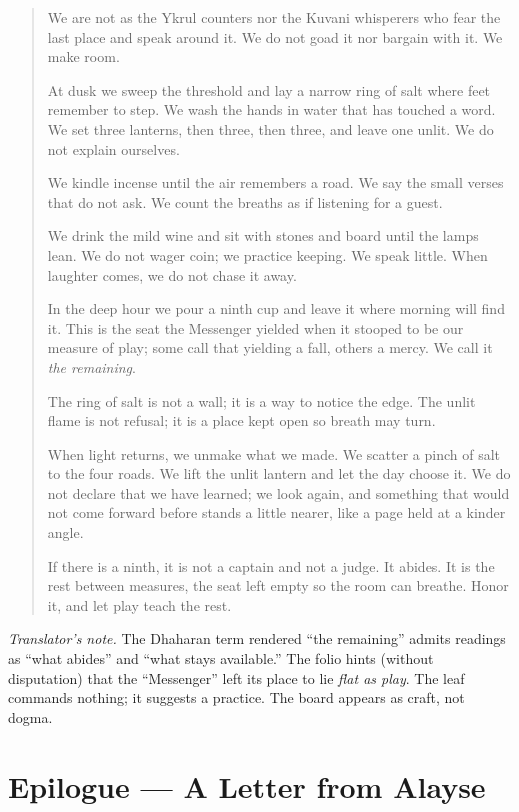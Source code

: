 \documentclass[11pt]{article}
\numberwithin{equation}{section} %
\theoremstyle{plain} %
\theoremstyle{definition} %
\theoremstyle{remark} %
\begin{document}
\medskip
\begin{quote}\small
We are not as the Ykrul counters nor the Kuvani whisperers who fear the last place and speak around it. We do not goad it nor bargain with it. We make room.

At dusk we sweep the threshold and lay a narrow ring of salt where feet remember to step. We wash the hands in water that has touched a word. We set three lanterns, then three, then three, and leave one unlit. We do not explain ourselves.

We kindle incense until the air remembers a road. We say the small verses that do not ask. We count the breaths as if listening for a guest.

We drink the mild wine and sit with stones and board until the lamps lean. We do not wager coin; we practice keeping. We speak little. When laughter comes, we do not chase it away.

In the deep hour we pour a ninth cup and leave it where morning will find it. This is the seat the Messenger yielded when it stooped to be our measure of play; some call that yielding a fall, others a mercy. We call it \emph{the remaining}.

The ring of salt is not a wall; it is a way to notice the edge. The unlit flame is not refusal; it is a place kept open so breath may turn.

When light returns, we unmake what we made. We scatter a pinch of salt to the four roads. We lift the unlit lantern and let the day choose it. We do not declare that we have learned; we look again, and something that would not come forward before stands a little nearer, like a page held at a kinder angle.

If there is a ninth, it is not a captain and not a judge. It abides. It is the rest between measures, the seat left empty so the room can breathe. Honor it, and let play teach the rest.
\end{quote}

\medskip
\noindent\textit{Translator’s note.} The Dhaharan term rendered “the remaining” admits readings as “what abides” and “what stays available.” The folio hints (without disputation) that the “Messenger” left its place to lie \emph{flat as play}. The leaf commands nothing; it suggests a practice. The board appears as craft, not dogma.

\section*{Epilogue — A Letter from Alayse}
\end{document}
